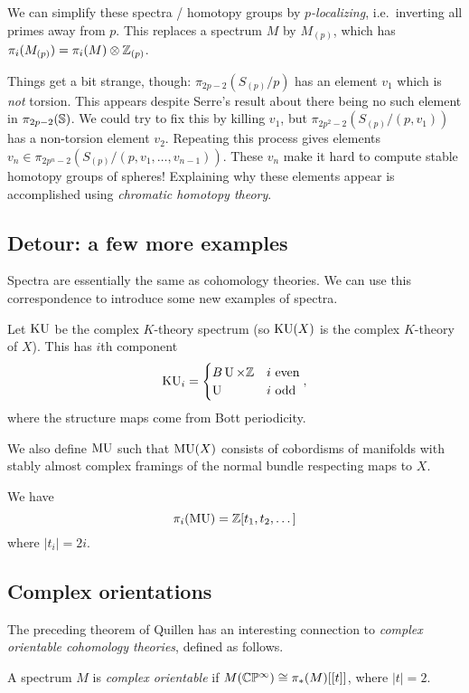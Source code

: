 \documentclass{article}
\begin{document}
We can simplify these spectra / homotopy groups by \emph{$p$-localizing}, i.e.\ inverting all primes away from $p$.
This replaces a spectrum $M$ by $M_{(p)}$, which has $\pi_i(M_{(p)}) = \pi_i(M) \otimes \mathbb{Z}_{(p)}$.

Things get a bit strange, though: $\pi_{2p-2}(S_{(p)}/p)$ has an element $v_1$ which is \emph{not} torsion.
This appears despite Serre's result about there being no such element in $\pi_{2p-2}(\mathbb{S})$.
We could try to fix this by killing $v_1$, but $\pi_{2p^2-2}(S_{(p)}/(p,v_1))$ has a non-torsion element $v_2$.
Repeating this process gives elements $v_n \in \pi_{2p^n-2}(S_{(p)}/(p,v_1,\dots,v_{n-1}))$.
These $v_n$ make it hard to compute stable homotopy groups of spheres!
Explaining why these elements appear is accomplished using \emph{chromatic homotopy theory}.

\subsection{Detour: a few more examples}

Spectra are essentially the same as cohomology theories.
We can use this correspondence to introduce some new examples of spectra.

Let $\mathrm{KU}$ be the complex $K$-theory spectrum (so $\mathrm{KU}(X)$ is the complex $K$-theory of $X$).
This has $i$th component
\[
	\mathrm{KU}_i = \begin{cases}
		B\operatorname{U} \times \mathbb{Z} & i \textrm{ even} \\
		\operatorname{U} & i \textrm{ odd} \\
	\end{cases},
\]
where the structure maps come from Bott periodicity.

We also define $\mathrm{MU}$ such that $\mathrm{MU}(X)$ consists of cobordisms of manifolds with stably almost complex framings of the normal bundle respecting maps to $X$.

\begin{thm}[Quillen]
	We have
	\[
		\pi_i(\mathrm{MU}) = \mathbb{Z}[t_1, t_2, \dots]
	\]
	where $|t_i| = 2i$.
\end{thm}

\subsection{Complex orientations}

The preceding theorem of Quillen has an interesting connection to \emph{complex orientable cohomology theories}, defined as follows.

\begin{dfn}
	A spectrum $M$ is \emph{complex orientable} if $M(\mathbb{C}\mathbb{P}^\infty) \cong \pi_*(M)[[t]]$, where $|t| = 2$.
\end{dfn}
\end{document}
